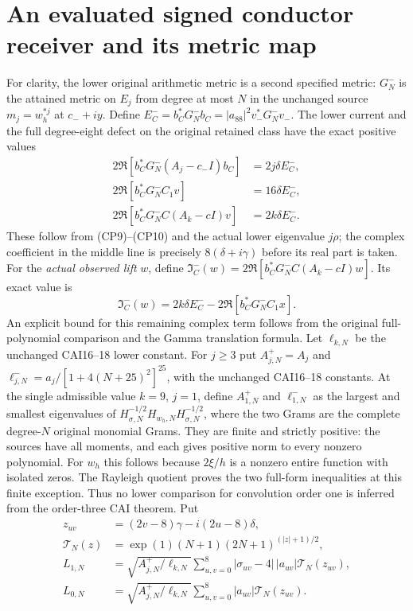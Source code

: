 \documentclass[11pt]{article}
\begin{document}
\section{An evaluated signed conductor receiver and its metric map}
For clarity, the lower original arithmetic metric is a second specified
metric: $G^-_N$ is the attained metric on $E_j$ from degree at most $N$
in the unchanged source $m_j=w_h^{*j}$ at $c_-+iy$.
Define $E_C^-=b_C^*G^-_Nb_C=|a_{88}|^2v_-^*G^-_Nv_-$.
The lower current and the full degree-eight defect on the original
retained class have the exact positive values
\begin{equation}\tag{CP19}
 \begin{split}
 2\Re[b_C^*G^-_N(A_j-c_-I)b_C]&=2j\delta E_C^-,\\
 2\Re[b_C^*G^-_NC_1v]&=16\delta E_C^-,\\
 2\Re[b_C^*G^-_NC(A_k-cI)v]&=2k\delta E_C^-.
 \end{split}
\end{equation}
These follow from (CP9)--(CP10) and the actual lower eigenvalue
$j\rho$; the complex coefficient in the middle line is precisely
$8(\delta+i\gamma)$ before its real part is taken.
For the \emph{actual observed lift} $w$, define
$\mathfrak I_C^-(w)=2\Re[b_C^*G^-_NC(A_k-cI)w]$. Its exact value is
\begin{equation}\tag{CP20}
 \mathfrak I_C^-(w)=2k\delta E_C^-
                      -2\Re[b_C^*G^-_NC_1x].
\end{equation}
An explicit bound for this remaining complex term follows from the
original full-polynomial comparison and the Gamma translation formula.
Let $\ell_{k,N}$ be the unchanged CAI16--18 lower constant. For $j\ge3$
put $A_{j,N}^+=A_j$ and $\ell_{j,N}^-=a_j/[1+4(N+25)^2]^{25}$,
with the unchanged CAI16--18 constants. At the single admissible value
$k=9$, $j=1$, define $A_{1,N}^+$ and $\ell_{1,N}^-$ as the largest
and smallest eigenvalues of
$H_{\sigma,N}^{-1/2}H_{w_h,N}H_{\sigma,N}^{-1/2}$, where the two
Grams are the complete degree-$N$ original monomial Grams.
They are finite and strictly positive: the sources have all moments,
and each gives positive norm to every nonzero polynomial. For $w_h$ this
follows because $2\xi/h$ is a nonzero entire function with isolated zeros.
The Rayleigh quotient proves the two full-form inequalities at this
finite exception. Thus no lower comparison for convolution order one
is inferred from the order-three CAI theorem. Put
\begin{equation}\tag{CP21}
 \begin{split}
 z_{uv}&=(2v-8)\gamma-i(2u-8)\delta,\\
 \mathcal T_N(z)&=\exp(1)(N+1)(2N+1)^{(|z|+1)/2},\\
 L_{1,N}&=\sqrt{A_{j,N}^+/\ell_{k,N}}
       \sum_{u,v=0}^8|\sigma_{uv}-4|\,|a_{uv}|\mathcal T_N(z_{uv}),\\
 L_{0,N}&=\sqrt{A_{j,N}^+/\ell_{k,N}}
       \sum_{u,v=0}^8|a_{uv}|\mathcal T_N(z_{uv}).
 \end{split}
\end{equation}
\end{document}

